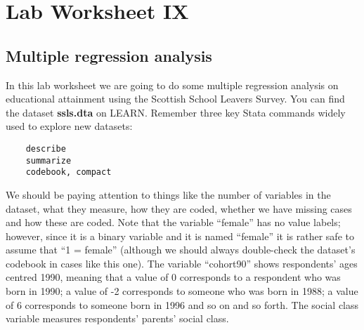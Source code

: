 \documentclass{article}
\begin{document}
	
\section*{\hfil Lab Worksheet IX \hfil}
\subsection*{Multiple regression analysis}

In this lab worksheet we are going to do some multiple regression analysis on educational attainment using the Scottish School Leavers Survey. You can find the dataset \textbf{ssls.dta} on LEARN. Remember three key Stata commands widely used to explore new datasets:

\begin{lstlisting}
	describe
	summarize
	codebook, compact
\end{lstlisting}

We should be paying attention to things like the number of variables in the dataset, what they measure, how they are coded, whether we have missing cases and how these are coded. Note that the variable ``female'' has no value labels; however, since it is a binary variable and it is named ``female'' it is rather safe to assume that ``1 = female'' (although we should always double-check the dataset's codebook in cases like this one). The variable ``cohort90'' shows respondents' ages centred 1990, meaning that a value of 0 corresponds to a respondent who was born in 1990; a value of -2 corresponds to someone who was born in 1988; a value of 6 corresponds to someone born in 1996 and so on and so forth. The social class variable measures respondents' parents' social class.
\end{document}
